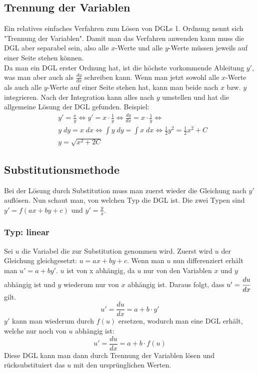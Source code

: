 \documentclass[a4paper,10pt]{scrartcl}
\begin{document}
        \subsection{Trennung der Variablen}
        Ein relatives einfaches Verfahren zum Lösen von DGLs 1. Ordnung nennt sich "Trennung der Variablen". Damit man das Verfahren anwenden kann muss die DGL aber
        separabel sein, also alle \(x\)-Werte und alle \(y\)-Werte müssen jeweils auf einer Seite stehen können. \\
        Da man ein DGL erster Ordnung hat, ist die höchste vorkommende Ableitung \(y'\), was man aber auch als \(\frac{dy}{dx}\) schreiben kann. Wenn man jetzt sowohl alle 
        \(x\)-Werte als auch alle \(y\)-Werte auf einer Seite stehen hat, kann man beide nach \(x\) bzw. \(y\) integrieren. Nach der Integration kann alles nach \(y\) umstellen
        und hat die allgemeine Lösung der DGL gefunden. Beispiel:
        \begin{equation}
            \begin{aligned}  
            & y' = \frac{x}{y} \Leftrightarrow y' = x \cdot \frac{1}{y} \Leftrightarrow \frac{dy}{dx} = x \cdot \frac{1}{y}  \Leftrightarrow \\
            & y \; dy = x \; dx  \Leftrightarrow \int y \; dy = \int x \; dx \Leftrightarrow \frac{1}{2} y^2 = \frac{1}{2} x^2 + C \\
            & y = \sqrt{x^2 + 2C}
            \end{aligned}  
        \end{equation}
        
        \subsection{Substitutionsmethode}
        Bei der Lösung durch Substitution muss man zuerst wieder die Gleichung nach \(y'\) auflösen. Nun schaut man, von welchen Typ die DGL ist.
        Die zwei Typen sind \(y' = f(ax + by + c)\) und \(y' = \frac{y}{x}\).
        \subsubsection{Typ: linear}
        Sei \(u\) die Variabel die zur Substitution genommen wird. Zuerst wird \(u\) der Gleichung gleichgesetzt: \(u = ax + by +c\). Wenn man \(u\) nun
        differenziert erhält man \(u' = a + by'\). \(u\) ist von x abhängig, da \(u\) nur von den Variablen \(x\) und \(y\) abhängig ist und \(y\) wiederum 
        nur von \(x\) abhängig ist. Daraus folgt, dass \(u' = \cfrac{du}{dx}\) gilt. 
        \begin{equation}
            u' = \frac{du}{dx} = a + b \cdot y'
        \end{equation}
        \(y'\) kann man wiederum durch \(f(u)\) ersetzen, wodurch man eine DGL erhält, welche nur noch von \(u\) abhängig ist: 
        \begin{equation}
            u' = \frac{du}{dx} = a + b \cdot f(u)
        \end{equation}
        Diese DGL kann man dann durch Trennung der Variablen lösen und rücksubstituiert das \(u\) mit den ursprünglichen Werten.
\end{document}
